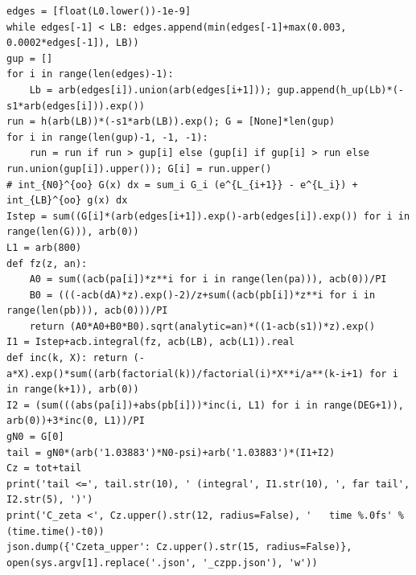 \documentclass[11pt,reqno]{amsart}
\numberwithin{equation}{section}
\theoremstyle{definition}
\theoremstyle{remark}
\begin{document}
\begin{lstlisting}
edges = [float(L0.lower())-1e-9]
while edges[-1] < LB: edges.append(min(edges[-1]+max(0.003, 0.0002*edges[-1]), LB))
gup = []
for i in range(len(edges)-1):
    Lb = arb(edges[i]).union(arb(edges[i+1])); gup.append(h_up(Lb)*(-s1*arb(edges[i])).exp())
run = h(arb(LB))*(-s1*arb(LB)).exp(); G = [None]*len(gup)
for i in range(len(gup)-1, -1, -1):
    run = run if run > gup[i] else (gup[i] if gup[i] > run else run.union(gup[i]).upper()); G[i] = run.upper()
# int_{N0}^{oo} G(x) dx = sum_i G_i (e^{L_{i+1}} - e^{L_i}) + int_{LB}^{oo} g(x) dx
Istep = sum((G[i]*(arb(edges[i+1]).exp()-arb(edges[i]).exp()) for i in range(len(G))), arb(0))
L1 = arb(800)
def fz(z, an):
    A0 = sum((acb(pa[i])*z**i for i in range(len(pa))), acb(0))/PI
    B0 = (((-acb(dA)*z).exp()-2)/z+sum((acb(pb[i])*z**i for i in range(len(pb))), acb(0)))/PI
    return (A0*A0+B0*B0).sqrt(analytic=an)*((1-acb(s1))*z).exp()
I1 = Istep+acb.integral(fz, acb(LB), acb(L1)).real
def inc(k, X): return (-a*X).exp()*sum((arb(factorial(k))/factorial(i)*X**i/a**(k-i+1) for i in range(k+1)), arb(0))
I2 = (sum(((abs(pa[i])+abs(pb[i]))*inc(i, L1) for i in range(DEG+1)), arb(0))+3*inc(0, L1))/PI
gN0 = G[0]
tail = gN0*(arb('1.03883')*N0-psi)+arb('1.03883')*(I1+I2)
Cz = tot+tail
print('tail <=', tail.str(10), ' (integral', I1.str(10), ', far tail', I2.str(5), ')')
print('C_zeta <', Cz.upper().str(12, radius=False), '   time %.0fs' % (time.time()-t0))
json.dump({'Czeta_upper': Cz.upper().str(15, radius=False)}, open(sys.argv[1].replace('.json', '_czpp.json'), 'w'))
\end{lstlisting}
\end{document}
